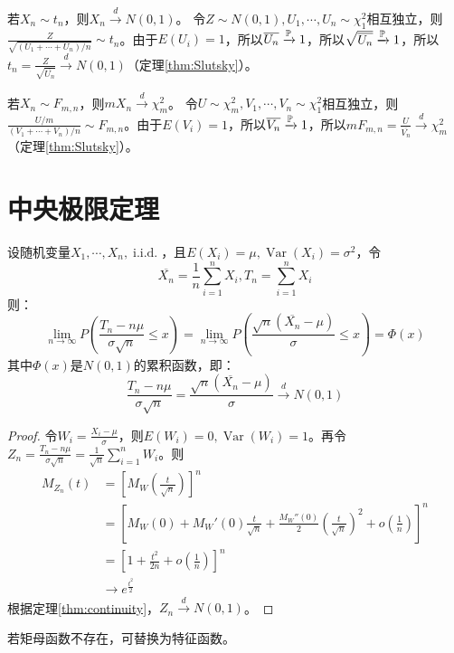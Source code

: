 \begin{example}\label{ex:t_disc_to_normal}
    若$X_n \sim t_n$，则$X_n \xrightarrow{d} N(0,1)$。
    令$Z \sim N(0,1),U_1,\cdots ,U_n \sim \chi^2_1$相互独立，则$\frac{Z}{\sqrt{(U_1+\cdots+U_n)/n}} \sim t_n$。由于$E(U_i)=1$，所以$\overline{U_n} \xrightarrow{\P} 1$，所以$\sqrt{\overline{U_n}} \xrightarrow{\P} 1$，所以$t_n=\frac{Z}{\sqrt{\overline{U_n}}} \xrightarrow{d} N(0,1)$（定理\ref{thm:Slutsky}）。
\end{example}

\begin{example}
    若$X_n \sim F_{m,n}$，则$mX_n \xrightarrow{d} \chi^2_m$。
    令$U \sim \chi^2_m,V_1,\cdots ,V_n \sim \chi^2_1$相互独立，则$\frac{U/m}{(V_1+\cdots+V_n)/n} \sim F_{m,n}$。由于$E(V_i)=1$，所以$\overline{V_n} \xrightarrow{\P} 1$，所以$mF_{m,n}=\frac{U}{\overline{V_n}} \xrightarrow{d} \chi^2_m$（定理\ref{thm:Slutsky}）。
\end{example}

\section{中央极限定理}

\begin{theorem}[中央极限定理]\label{thm:central_limit}
    设随机变量$X_1,\cdots ,X_n,\operatorname{i.i.d.}$，且$E(X_i)=\mu,\operatorname{Var}(X_i)=\sigma^2$，令
    \[ \overline{X_n} = \frac{1}{n}\sum_{i=1}^n X_i, T_n=\sum_{i=1}^n X_i\]
    则：
    \[ \lim_{n \to \infty}P(\frac{T_n-n \mu}{\sigma\sqrt{n}}\le x)=\lim_{n \to \infty}P(\frac{\sqrt{n}(\overline{X_n}-\mu)}{\sigma}\le x) =\Phi(x)\]
    其中$\Phi(x)$是$N(0,1)$的累积函数，即：
    \[ \frac{T_n-n \mu}{\sigma\sqrt{n}}=\frac{\sqrt{n}(\overline{X_n}-\mu)}{\sigma} \xrightarrow{d} N(0,1)\]
\end{theorem}

\begin{proof}
    令$W_i=\frac{X_i-\mu}{\sigma}$，则$E(W_i)=0,\operatorname{Var}(W_i)=1$。再令$Z_n=\frac{T_n-n \mu}{\sigma\sqrt{n}}=\frac{1}{\sqrt{n}}\sum_{i=1}^n W_i$。则
    \begin{align*}
        M_{Z_n}(t) &= \left[ M_{W}(\frac{t}{\sqrt{n}}) \right]^n \\
        &= \left[ M_{W}(0)+M_{W}'(0)\frac{t}{\sqrt{n}}+\frac{M_{W}''(0)}{2}(\frac{t}{\sqrt{n}})^2 +o(\frac{1}{n}) \right]^n \\
        &= \left[ 1 + \frac{t^2}{2n}+ o(\frac{1}{n}) \right]^n\\
        & \to e^{\frac{t^2}{2}}
    \end{align*}
    根据定理\ref{thm:continuity}，$Z_n \xrightarrow{d} N(0,1)$。
\end{proof}
\begin{remark}
    若矩母函数不存在，可替换为特征函数。
\end{remark}

